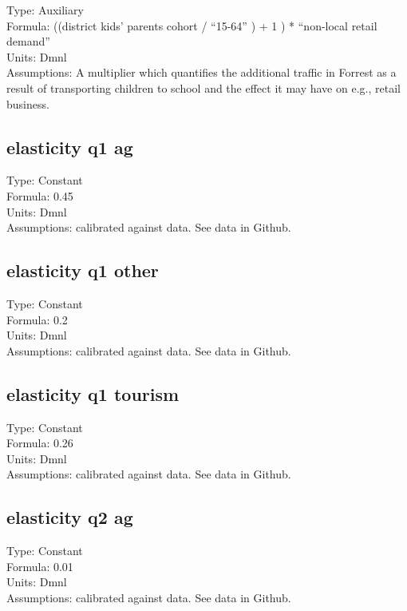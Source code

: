 \documentclass[
  11pt,
]{book}
\begin{document}
Type: Auxiliary\\
Formula: ((district kids' parents cohort / ``15-64'' ) + 1 ) * ``non-local retail demand''\\
Units: Dmnl\\
Assumptions: A multiplier which quantifies the additional traffic in Forrest as a result of transporting children to school and the effect it may have on e.g., retail business.

\hypertarget{elasticity-q1-ag}{%
\subsection{elasticity q1 ag}\label{elasticity-q1-ag}}

Type: Constant\\
Formula: 0.45\\
Units: Dmnl\\
Assumptions: calibrated against data. See data in Github.

\hypertarget{elasticity-q1-other}{%
\subsection{elasticity q1 other}\label{elasticity-q1-other}}

Type: Constant\\
Formula: 0.2\\
Units: Dmnl\\
Assumptions: calibrated against data. See data in Github.

\hypertarget{elasticity-q1-tourism}{%
\subsection{elasticity q1 tourism}\label{elasticity-q1-tourism}}

Type: Constant\\
Formula: 0.26\\
Units: Dmnl\\
Assumptions: calibrated against data. See data in Github.

\hypertarget{elasticity-q2-ag}{%
\subsection{elasticity q2 ag}\label{elasticity-q2-ag}}

Type: Constant\\
Formula: 0.01\\
Units: Dmnl\\
Assumptions: calibrated against data. See data in Github.
\end{document}
